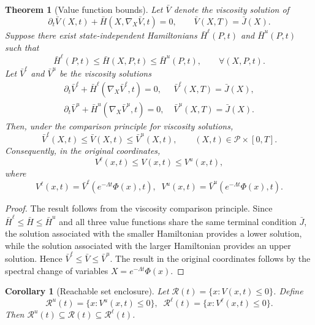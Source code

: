 \documentclass[letterpaper, 10 pt, conference]{ieeeconf}
\theoremstyle{plain}
\newtheorem{theorem}{Theorem}
\newtheorem{corollary}{Corollary}
\theoremstyle{definition}
\begin{document}
\begin{theorem}[Value function bounds]
    Let $\bar V$ denote the viscosity solution of
    \[
    \partial_t \bar V(X,t)+\bar H(X,\nabla_X\bar V,t)=0,
    \qquad
    \bar V(X,T)=\bar J(X).
    \]
    Suppose there exist state-independent Hamiltonians
    $\bar H^\ell(P,t)$ and $\bar H^u(P,t)$ such that
    \[
    \bar H^\ell(P,t)
    \le
    \bar H(X,P,t)
    \le
    \bar H^u(P,t),
    \qquad
    \forall (X,P,t).
    \]
    Let $\bar V^\ell$ and $\bar V^u$ be the viscosity solutions
    \begin{equation*}
        \begin{aligned}
            \partial_t \bar V^{\ell} + \bar H^{\ell}(\nabla_X\bar V^{\ell},t)=0,&
            \;
            \bar V^{\ell}(X,T)=\bar J(X),
            \\
            \partial_t \bar V^u + \bar H^u(\nabla_X\bar V^u,t)=0,&
            \;
            \bar V^u(X,T)=\bar J(X).
        \end{aligned}
    \end{equation*}
    Then, under the comparison principle for viscosity solutions,
    \[
    \bar V^\ell(X,t)
    \le
    \bar V(X,t)
    \le
    \bar V^u(X,t),
    \qquad
    (X,t)\in\mathcal P\times[0,T].
    \]
    Consequently, in the original coordinates,
    \[
    V^\ell(x,t)
    \le
    V(x,t)
    \le
    V^u(x,t),
    \]
    where
    \[
    V^\ell(x,t)=\bar V^\ell(e^{-\Lambda t}\Phi(x),t),
    \;\;
    V^u(x,t)=\bar V^u(e^{-\Lambda t}\Phi(x),t).
    \]
\end{theorem}

\begin{proof}
    The result follows from the viscosity comparison principle.
    Since $\bar H^\ell\le \bar H\le \bar H^u$ and all three value functions share the same terminal condition $\bar J$, the solution associated with the smaller Hamiltonian provides a lower solution, while the solution associated with the larger Hamiltonian provides an upper solution. Hence $\bar V^\ell\le \bar V\le \bar V^u$.
    The result in the original coordinates follows by the spectral change of variables $X=e^{-\Lambda t}\Phi(x)$.
\end{proof}
\begin{corollary}[Reachable set enclosure]
    Let $\mathcal R(t)=\{x:V(x,t)\le0\}$. Define
    \[
    \mathcal R^u(t)=\{x:V^u(x,t)\le0\},
    \;\;
    \mathcal R^\ell(t)=\{x:V^\ell(x,t)\le0\}.
    \]
    Then $\mathcal R^u(t) \subseteq \mathcal R(t) \subseteq \mathcal R^\ell(t)$.
\end{corollary}
\end{document}
